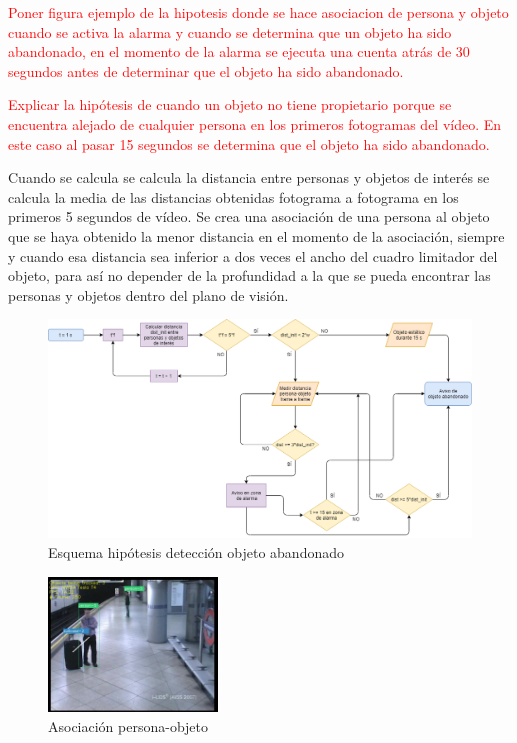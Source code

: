 \textcolor{red}{Poner figura ejemplo de la hipotesis donde se hace asociacion de persona y objeto cuando se activa la alarma y cuando se determina que un objeto ha sido abandonado, en el momento de la alarma se ejecuta una cuenta atrás de 30 segundos antes de determinar que el objeto ha sido abandonado.}

\textcolor{red}{Explicar la hipótesis de cuando un objeto no tiene propietario porque se encuentra alejado de cualquier persona en los primeros fotogramas del vídeo. En este caso al pasar 15 segundos se determina que el objeto ha sido abandonado.}

Cuando se calcula se calcula la distancia entre personas y objetos de interés se calcula la media de las distancias obtenidas fotograma a fotograma en los primeros 5 segundos de vídeo. Se crea una asociación de una persona al objeto que se haya obtenido la menor distancia en el momento de la asociación, siempre y cuando esa distancia sea inferior a dos veces el ancho del cuadro limitador del objeto, para así no depender de la profundidad a la que se pueda encontrar las personas y objetos dentro del plano de visión.

\begin{figure}[ht]
\centering
\includegraphics[width=1\textwidth]{img/chapters/desarrollo/abandoned-object-scheme.png}
\caption{\label{fig:abandoned-object-scheme}Esquema hipótesis detección objeto abandonado}
\end{figure}

\newpage

\begin{figure}[ht]
\centering
\includegraphics[width=0.4\textwidth]{img/chapters/desarrollo/link-persona-objeto.jpg}
\caption{\label{fig:link-persona-objeto}Asociación persona-objeto}
\end{figure}

